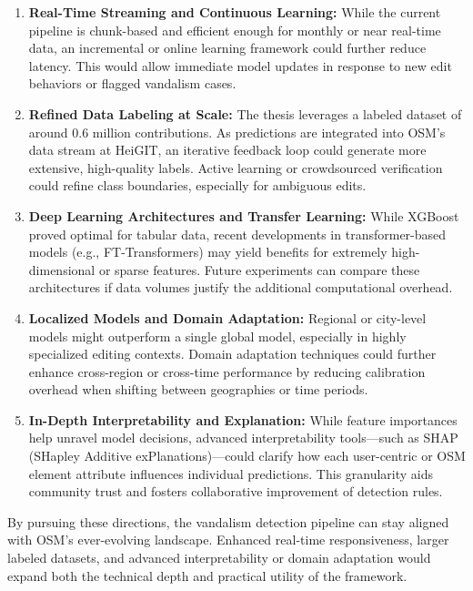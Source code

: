 \documentclass[
    13pt, %
    a4paper, %
    listof=totoc, %
    bibliography=totoc, %
    index=totoc, %
    headsepline
]{scrreprt}
\begin{document}
\begin{enumerate}
    \item \textbf{Real-Time Streaming and Continuous Learning:} 
    While the current pipeline is chunk-based and efficient enough for monthly or near real-time data, an incremental or online learning framework could further reduce latency. This would allow immediate model updates in response to new edit behaviors or flagged vandalism cases.

    \item \textbf{Refined Data Labeling at Scale:}
    The thesis leverages a labeled dataset of around 0.6 million contributions. As predictions are integrated into OSM’s data stream at HeiGIT, an iterative feedback loop could generate more extensive, high-quality labels. Active learning or crowdsourced verification could refine class boundaries, especially for ambiguous edits.

    \item \textbf{Deep Learning Architectures and Transfer Learning:}
    While XGBoost proved optimal for tabular data, recent developments in transformer-based models (e.g., FT-Transformers) may yield benefits for extremely high-dimensional or sparse features. Future experiments can compare these architectures if data volumes justify the additional computational overhead.

    \item \textbf{Localized Models and Domain Adaptation:}
    Regional or city-level models might outperform a single global model, especially in highly specialized editing contexts. Domain adaptation techniques could further enhance cross-region or cross-time performance by reducing calibration overhead when shifting between geographies or time periods.

    \item \textbf{In-Depth Interpretability and Explanation:}
    While feature importances help unravel model decisions, advanced interpretability tools—such as SHAP (SHapley Additive exPlanations)—could clarify how each user-centric or OSM element attribute influences individual predictions. This granularity aids community trust and fosters collaborative improvement of detection rules.

\end{enumerate}

\noindent
By pursuing these directions, the vandalism detection pipeline can stay aligned with OSM’s ever-evolving landscape. Enhanced real-time responsiveness, larger labeled datasets, and advanced interpretability or domain adaptation would expand both the technical depth and practical utility of the framework.
\end{document}
